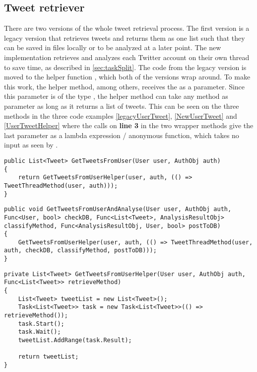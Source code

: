 \subsection{Tweet retriever} \label{sub:tweetretriever}
There are two versions of the whole tweet retrieval process. The first version
is a legacy version that retrieves tweets and returns them as one list such that
they can be saved in files locally or to be analyzed at a later point.
The new implementation retrieves and analyzes each Twitter account on their own
thread to save time, as described in \autoref{sec:taskSplit}. The code from the
legacy version is moved to the helper function ,
which both of the versions wrap around. To make this work, the helper method,
among others, receives the  as a parameter. Since this
parameter is of the type , the helper method can take
any method as parameter as long as it returns a list of tweets. This can be
seen on the three methods in the three code examples \autoref{legacyUserTweet},
\autoref{NewUserTweet} and \autoref{UserTweetHelper} where the calls on
\textbf{line 3} in the two wrapper methods give the last parameter as a lambda
expression / anonymous function, which takes no input as seen by \textc{()=>}.\\

\begin{minipage}[H]{\linewidth}
\begin{lstlisting}[caption = Legacy method call , label = legacyUserTweet ] 
public List<Tweet> GetTweetsFromUser(User user, AuthObj auth)
{	
    return GetTweetsFromUserHelper(user, auth, (() => TweetThreadMethod(user, auth)));
}
\end{lstlisting}
\end{minipage}

\begin{minipage}[H]{\linewidth}
\begin{lstlisting}[caption = Current method call to speed up execution , label =
NewUserTweet ] 
public void GetTweetsFromUserAndAnalyse(User user, AuthObj auth, Func<User, bool> checkDB, Func<List<Tweet>, AnalysisResultObj> classifyMethod, Func<AnalysisResultObj, User, bool> postToDB)
{
    GetTweetsFromUserHelper(user, auth, (() => TweetThreadMethod(user, auth, checkDB, classifyMethod, postToDB)));
}
\end{lstlisting}
\end{minipage}

\begin{minipage}[H]{\linewidth}
\begin{lstlisting}[caption = The GetTweetsFromUserHelper, label =
UserTweetHelper]
private List<Tweet> GetTweetsFromUserHelper(User user, AuthObj auth, Func<List<Tweet>> retrieveMethod)
{
    List<Tweet> tweetList = new List<Tweet>();
    Task<List<Tweet>> task = new Task<List<Tweet>>(() => retrieveMethod());
    task.Start();
    task.Wait();
    tweetList.AddRange(task.Result);

    return tweetList;
}
\end{lstlisting}
\end{minipage}

